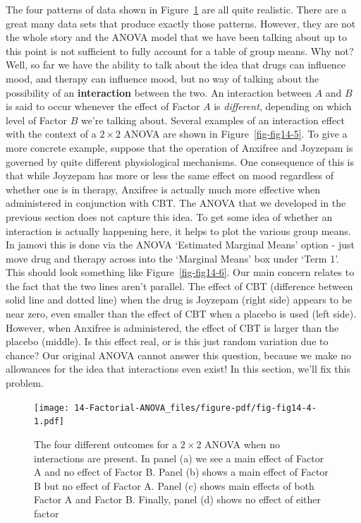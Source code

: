 \documentclass[
  a4paper,
]{book}
\begin{document}
The four patterns of data shown in Figure~\ref{fig-fig14-4} are all
quite realistic. There are a great many data sets that produce exactly
those patterns. However, they are not the whole story and the ANOVA
model that we have been talking about up to this point is not sufficient
to fully account for a table of group means. Why not? Well, so far we
have the ability to talk about the idea that drugs can influence mood,
and therapy can influence mood, but no way of talking about the
possibility of an \textbf{interaction} between the two. An interaction
between \(A\) and \(B\) is said to occur whenever the effect of Factor
\(A\) is \emph{different}, depending on which level of Factor \(B\)
we're talking about. Several examples of an interaction effect with the
context of a \(2 \times 2\) ANOVA are shown in Figure~\ref{fig-fig14-5}.
To give a more concrete example, suppose that the operation of Anxifree
and Joyzepam is governed by quite different physiological mechanisms.
One consequence of this is that while Joyzepam has more or less the same
effect on mood regardless of whether one is in therapy, Anxifree is
actually much more effective when administered in conjunction with CBT.
The ANOVA that we developed in the previous section does not capture
this idea. To get some idea of whether an interaction is actually
happening here, it helps to plot the various group means. In jamovi this
is done via the ANOVA `Estimated Marginal Means' option - just move drug
and therapy across into the `Marginal Means' box under `Term 1'. This
should look something like Figure~\ref{fig-fig14-6}. Our main concern
relates to the fact that the two lines aren't parallel. The effect of
CBT (difference between solid line and dotted line) when the drug is
Joyzepam (right side) appears to be near zero, even smaller than the
effect of CBT when a placebo is used (left side). However, when Anxifree
is administered, the effect of CBT is larger than the placebo (middle).
Is this effect real, or is this just random variation due to chance? Our
original ANOVA cannot answer this question, because we make no
allowances for the idea that interactions even exist! In this section,
we'll fix this problem.

\begin{figure}

\texttt{[image: 14-Factorial-ANOVA\_files/figure-pdf/fig-fig14-4-1.pdf]} \hfill{}

\caption{\label{fig-fig14-4}The four different outcomes for a
\(2 \times 2\) ANOVA when no interactions are present. In panel (a) we
see a main effect of Factor A and no effect of Factor B. Panel (b) shows
a main effect of Factor B but no effect of Factor A. Panel (c) shows
main effects of both Factor A and Factor B. Finally, panel (d) shows no
effect of either factor}

\end{figure}
\end{document}
